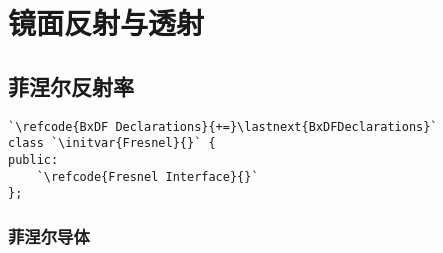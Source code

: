 \section{镜面反射与透射}\label{sec:镜面反射与透射}

\subsection{菲涅尔反射率}\label{sub:菲涅尔反射率}
\begin{lstlisting}
`\refcode{BxDF Declarations}{+=}\lastnext{BxDFDeclarations}`
class `\initvar{Fresnel}{}` {
public:
    `\refcode{Fresnel Interface}{}`
};
\end{lstlisting}

\subsubsection*{菲涅尔导体}